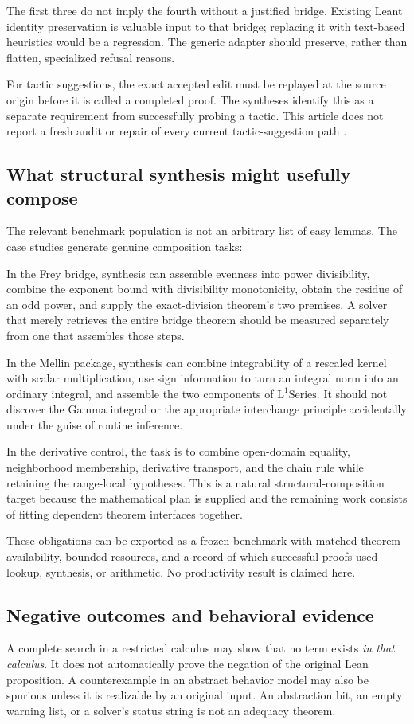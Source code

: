 \documentclass[11pt,a4paper]{article}
\newcommand{\Lone}{\operatorname{L^1Series}}
\theoremstyle{plain}\newtheorem{proposition}{Proposition}[section]
\theoremstyle{definition}\newtheorem{definition}[proposition]{Definition}
\theoremstyle{remark}\newtheorem{remark}[proposition]{Remark}
\begin{document}
The first three do not imply the fourth without a justified bridge. Existing Leant identity preservation is valuable input to that bridge; replacing it with text-based heuristics would be a regression. The generic adapter should preserve, rather than flatten, specialized refusal reasons.

For tactic suggestions, the exact accepted edit must be replayed at the source origin before it is called a completed proof. The syntheses identify this as a separate requirement from successfully probing a tactic. This article does not report a fresh audit or repair of every current tactic-suggestion path \cite{synA,synB}.

\subsection{What structural synthesis might usefully compose}
The relevant benchmark population is not an arbitrary list of easy lemmas. The case studies generate genuine composition tasks:

In the Frey bridge, synthesis can assemble evenness into power divisibility, combine the exponent bound with divisibility monotonicity, obtain the residue of an odd power, and supply the exact-division theorem's two premises. A solver that merely retrieves the entire bridge theorem should be measured separately from one that assembles those steps.

In the Mellin package, synthesis can combine integrability of a rescaled kernel with scalar multiplication, use sign information to turn an integral norm into an ordinary integral, and assemble the two components of \(\Lone\). It should not discover the Gamma integral or the appropriate interchange principle accidentally under the guise of routine inference.

In the derivative control, the task is to combine open-domain equality, neighborhood membership, derivative transport, and the chain rule while retaining the range-local hypotheses. This is a natural structural-composition target because the mathematical plan is supplied and the remaining work consists of fitting dependent theorem interfaces together.

These obligations can be exported as a frozen benchmark with matched theorem availability, bounded resources, and a record of which successful proofs used lookup, synthesis, or arithmetic. No productivity result is claimed here.

\subsection{Negative outcomes and behavioral evidence}
A complete search in a restricted calculus may show that no term exists \emph{in that calculus}. It does not automatically prove the negation of the original Lean proposition. A counterexample in an abstract behavior model may also be spurious unless it is realizable by an original input. An abstraction bit, an empty warning list, or a solver's status string is not an adequacy theorem.
\end{document}
